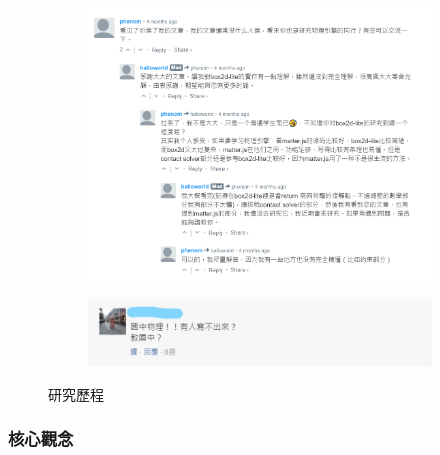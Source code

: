 \begin{figure}[h]
    \begin{subfigure}[b]{0.5\linewidth}
    \includegraphics[width=\linewidth]{./resources/physics/comment.png}
    \end{subfigure}
    \begin{subfigure}[b]{0.5\linewidth}
    \includegraphics[width=\linewidth]{./resources/physics/sour.jpg}
    \end{subfigure}
\caption{研究歷程}
\label{fig:Phy_research}
\end{figure}

\newpage

\subsubsection{核心觀念}
